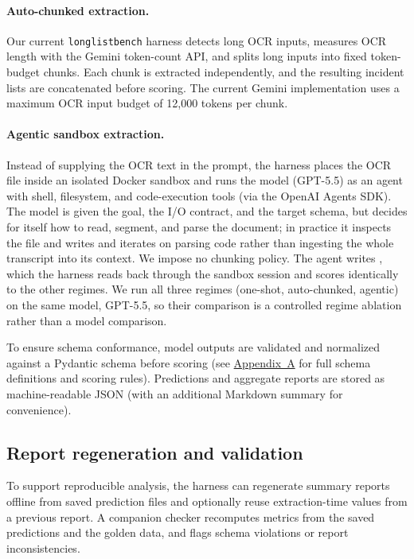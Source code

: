 \paragraph{Auto-chunked extraction.}
Our current \texttt{longlistbench} harness detects long OCR inputs, measures OCR length with the Gemini token-count API, and splits long inputs into fixed token-budget chunks. Each chunk is extracted independently, and the resulting incident lists are concatenated before scoring. The current Gemini implementation uses a maximum OCR input budget of 12{,}000 tokens per chunk.

\paragraph{Agentic sandbox extraction.}
Instead of supplying the OCR text in the prompt, the harness places the OCR file inside an isolated Docker sandbox and runs the model (GPT-5.5) as an agent with shell, filesystem, and code-execution tools (via the OpenAI Agents SDK). The model is given the goal, the I/O contract, and the target schema, but decides for itself how to read, segment, and parse the document; in practice it inspects the file and writes and iterates on parsing code rather than ingesting the whole transcript into its context. We impose no chunking policy. The agent writes , which the harness reads back through the sandbox session and scores identically to the other regimes. We run all three regimes (one-shot, auto-chunked, agentic) on the same model, GPT-5.5, so their comparison is a controlled regime ablation rather than a model comparison.

To ensure schema conformance, model outputs are validated and normalized against a Pydantic schema before scoring (see \hyperref[sec:appendix-schemas]{Appendix~A} for full schema definitions and scoring rules). Predictions and aggregate reports are stored as machine-readable JSON (with an additional Markdown summary for convenience).

\subsection{Report regeneration and validation}
To support reproducible analysis, the harness can regenerate summary reports offline from saved prediction files and optionally reuse extraction-time values from a previous report. A companion checker recomputes metrics from the saved predictions and the golden data, and flags schema violations or report inconsistencies.

